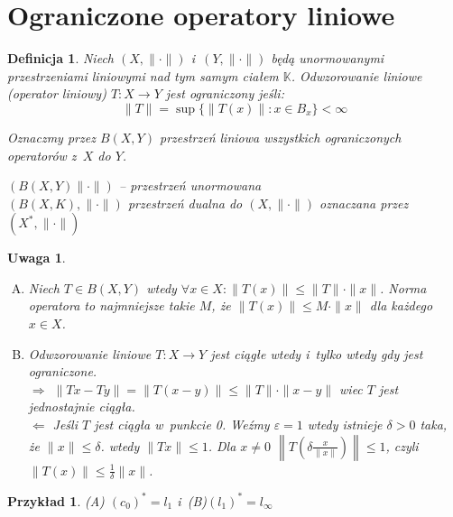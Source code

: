 \documentclass[11pt]{mwrep}
\renewcommand{\[}{\begin{equation}}
\renewcommand{\]}{\end{equation}}
\newcommand{\K}{\ensuremath{\mathbb{K}}}
\newcommand{\norm}{\|\cdot\|}
\newtheorem{uw}[subsection]{Uwaga}
\newtheorem{de}[subsection]{Definicja}
\newtheorem{ex}[subsection]{Przykład}
\newcounter{numer}
\begin{document}
\section{Ograniczone operatory liniowe}
\begin{de}
Niech $(X,\norm)$ i~$(Y,\norm)$ będą unormowanymi przestrzeniami liniowymi nad tym samym ciałem \K.
Odwzorowanie liniowe (operator liniowy) $T\colon X \to Y$ jest ograniczony jeśli:
$$\| T\| = \sup \{\|T(x)\|\colon x \in B_x\} < \infty$$

Oznaczmy przez $B(X,Y)$ przestrzeń liniowa wszystkich ograniczonych operatorów z~$X$ do $Y$.

$(B(X,Y) \norm)$ -- przestrzeń unormowana \\
$(B(X,K), \norm)$ przestrzeń dualna do $(X,\norm)$ oznaczana przez $(X^*,\norm)$
\end{de}
\begin{uw}
	\begin{enumerate}[(A)]
		\item Niech $T\in B(X,Y)$ wtedy $\forall x\in X: \|T(x)\| \le \|T\| \cdot \|x\|$. 
			Norma operatora to najmniejsze takie $M$, że $\|T(x)\| \le M \cdot \|x\|$ dla każdego $x\in X$.
		\item Odwzorowanie liniowe $T\colon X \to Y$ jest ciągłe wtedy i~tylko wtedy gdy jest ograniczone.\\
			$\Rightarrow$ $\|Tx-Ty\| = \|T(x-y)\| \le \|T\| \cdot \|x - y\|$ wiec $T$ jest jednostajnie ciągła.\\
			$\Leftarrow$ Jeśli $T$ jest ciągła w~punkcie 0. Weźmy $\varepsilon=1$ wtedy istnieje $\delta>0$ taka, że $\|x\|\le \delta$.
			wtedy $\|Tx\|\le 1$.
			Dla $x\not =  0$ $\left\|T\left( \delta \frac{x}{\|x\|} \right)\right\|\le 1$, czyli $\|T(x)\|\le \frac{1}{\delta}\|x\|$.

	\end{enumerate}
\end{uw}
\begin{ex}	
	\textup{(A)} $(c_0)^* = l_1$ i~\textup{(B)}$(l_1)^* = l_\infty$
\end{ex}
\end{document}
